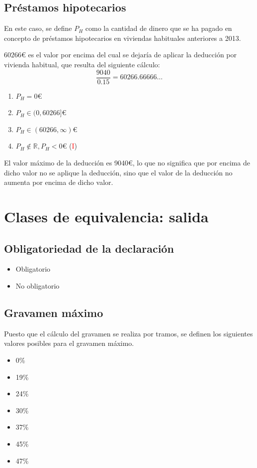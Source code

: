 \subsection{Préstamos hipotecarios}
En este caso, se define $P_{H}$ como la cantidad de dinero que se ha pagado
en concepto de préstamos hipotecarios en viviendas habituales anteriores a 2013.

$60266$€ es el valor por encima del cual se dejaría de aplicar la deducción por vivienda habitual,
que resulta del siguiente cálculo: $$\frac{9040}{0.15} = 60266.66666\dots$$

\begin{enumerate}
	\item $P_{H} = 0$€
	\item $P_{H} \in (0, 60266]$€
	\item $P_{H} \in (60266, \infty)$€
	\item $P_{H} \notin \mathbb{R}, P_{H} < 0$€ (\textcolor{red}{I})
\end{enumerate}

El valor máximo de la deducción es 9040€, lo que no significa que por encima de dicho valor no se aplique
la deducción, sino que el valor de la deducción no aumenta por encima de dicho valor.

\newpage{}
\section{Clases de equivalencia: salida}
\subsection{Obligatoriedad de la declaración}
\begin{itemize}
	\item Obligatorio
	\item No obligatorio
\end{itemize}

\subsection{Gravamen máximo}
Puesto que el cálculo del gravamen se realiza por tramos, se definen los siguientes
valores posibles para el gravamen máximo.

\begin{itemize}
	\item 0\%
	\item 19\%
	\item 24\%
	\item 30\%
	\item 37\%
	\item 45\%
	\item 47\%
\end{itemize}

